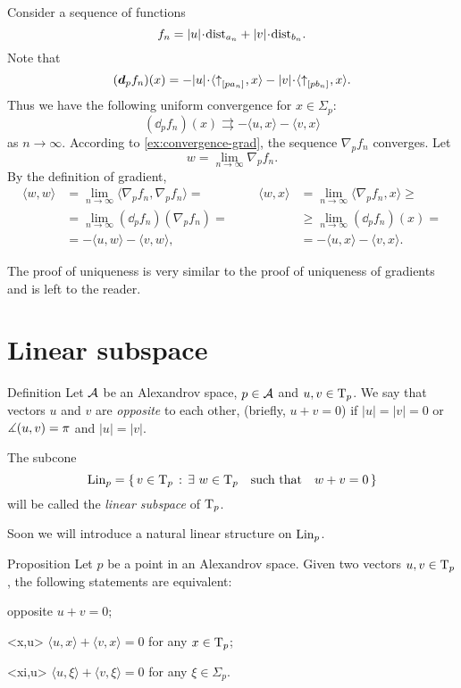 Consider a sequence of functions 
\[f_n=|u|\cdot\distfun_{a_n}+|v|\cdot\distfun_{b_n}.\]
Note that 
\[(\dd_pf_n)(x)=-|u|\cdot\langle \dir{p}{a_n},x\rangle -|v|\cdot\langle \dir{p}{b_n},x\rangle .\]
Thus we have the following uniform convergence for $x\in\Sigma_p$:
\[(\dd_pf_n)(x)\rightrightarrows-\langle u,x\rangle -\langle v,x\rangle \]
as $n\to\infty$.
According to \ref{ex:convergence-grad}, 
the sequence $\nabla_pf_n$ converges.
Let 
\[w=\lim_{n\to\infty}\nabla_pf_n.\]
By the definition of gradient,
\begin{align*}
\langle w,w\rangle &=\lim_{n\to\infty}\langle \nabla_pf_n,\nabla_pf_n\rangle =
&&&%
\langle w,x\rangle &=\lim_{n\to\infty}\langle \nabla_pf_n,x\rangle \ge
\\%
&=\lim_{n\to\infty}(\dd_p f_n)(\nabla_p f_n)
=
&&&%
&\ge
\lim_{n\to\infty}(\dd_pf_n)(x)
=
\\%
&=-\langle u,w\rangle -\langle v,w\rangle ,
&&&%
&=-\langle u,x\rangle -\langle v,x\rangle .
\end{align*}

The proof of uniqueness is very similar to the proof of uniqueness of gradients and is left to the reader.
\qedsf

\section{Linear subspace}

\begin{thm}{Definition}\label{def:opp+Lin}
Let $\mathcal{A}$ be an Alexandrov space, $p\in \mathcal{A}$ and $u,v\in\mathrm{T}_p$.
We say that vectors $u$ and $v$ are \emph{opposite}\label{def:opposite:page} to each other, (briefly, $u+v=0$) if $|u|=|v|=0$ or $\measuredangle(u,v)=\pi$ and $|u|=|v|$.

The subcone
\[\mathop{\rm Lin}\nolimits_p=\left\{\,{v\in\mathrm{T}_p}\,:\,{\exists\ w\in\mathrm{T}_p\quad \text{such that}\quad w+v=0}\,\right\}\]
will be called the \emph{linear subspace} of $\mathrm{T}_p$.
\end{thm}

Soon we will introduce a natural linear structure on $\mathop{\rm Lin}\nolimits_p$.

\begin{thm}{Proposition}\label{prop:opposite}
Let $p$ be a point in an Alexandrov space.
Given two vectors $u,v\in\mathrm{T}_p$, the following statements are equivalent:
\begin{subthm}{opposite} $u+v=0$;
\end{subthm}
\begin{subthm}{<x,u>} $\langle u,x\rangle +\langle v,x\rangle =0$ for any $x\in\mathrm{T}_p$;
\end{subthm}
\begin{subthm}{<xi,u>} $\langle u,\xi\rangle +\langle v,\xi\rangle =0$ for any $\xi\in\Sigma_p$.
\end{subthm}
\end{thm}

